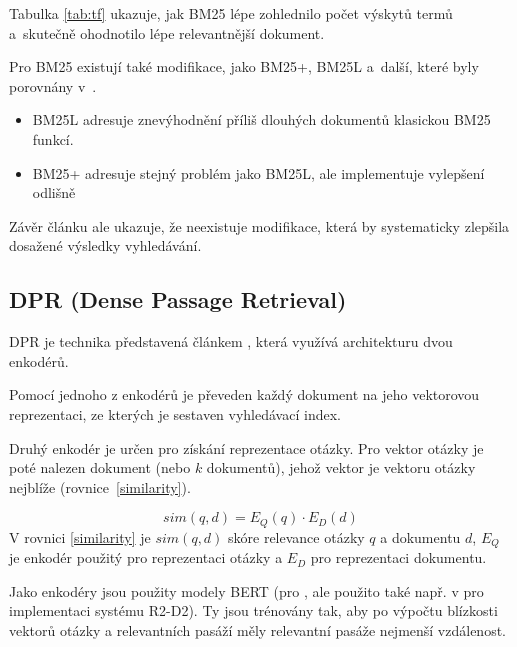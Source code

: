 Tabulka \ref{tab:tf} ukazuje, jak BM25 lépe zohlednilo počet výskytů termů a~skutečně ohodnotilo lépe relevantnější dokument.\par \medskip
Pro BM25 existují také modifikace, jako BM25+, BM25L a~další, které byly porovnány v~\cite{bm25_improvements}.\par
\begin{itemize}
    \item BM25L \cite{bm25_too_long} adresuje znevýhodnění příliš dlouhých dokumentů klasickou BM25 funkcí.
    \item BM25+ \cite{bm25_plus} adresuje stejný problém jako BM25L, ale implementuje vylepšení odlišně
\end{itemize}
Závěr článku \cite{bm25_improvements} ale ukazuje, že neexistuje modifikace, která by systematicky zlepšila dosažené výsledky vyhledávání.\par

\subsection{DPR (Dense Passage Retrieval)}
\label{dpr}
DPR je technika představená článkem \cite{dpr}, která využívá architekturu dvou enkodérů.\par
Pomocí jednoho z enkodérů je převeden každý dokument na jeho vektorovou reprezentaci, ze kterých je sestaven vyhledávací index.\par
Druhý enkodér je určen pro získání reprezentace otázky. Pro vektor otázky je poté nalezen dokument (nebo $k$ dokumentů), jehož vektor je vektoru otázky nejblíže (rovnice~\ref{similarity}).\par
\begin{equation}
    \label{similarity}
    sim(q,d) = E_Q(q)\cdot E_D(d)
\end{equation}
V rovnici \ref{similarity} \cite{dpr} je $sim(q,d)$ skóre relevance otázky $q$ a dokumentu $d$, $E_Q$ je enkodér použitý pro reprezentaci otázky a $E_D$ pro reprezentaci dokumentu.\par
Jako enkodéry jsou použity modely BERT (pro \cite{dpr}, ale použito také např. v \cite{fajcik2021pruning} pro implementaci systému R2-D2). Ty jsou trénovány tak, aby po výpočtu blízkosti vektorů otázky a relevantních pasáží měly relevantní pasáže nejmenší vzdálenost.


